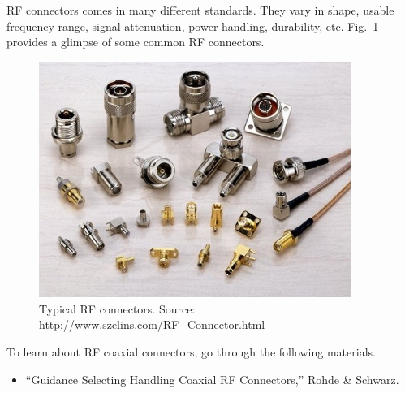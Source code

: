 \documentclass[letterpaper, 11pt]{article}
\begin{document}
RF connectors comes in many different standards. They vary in shape, usable frequency range, signal attenuation, power handling, durability, etc. Fig.~\ref{fig:connectors} provides a glimpse of some common RF connectors. 

\begin{figure}[h]
	\centering
	\includegraphics[width=4in]{connectors}
	\caption{Typical RF connectors. Source: \url{http://www.szelins.com/RF_Connector.html}}
	\label{fig:connectors}
\end{figure}

To learn about RF coaxial connectors, go through the following materials. 

\begin{itemize}[itemsep=0.1ex]
	\item ``Guidance Selecting Handling Coaxial RF Connectors,'' Rohde \& Schwarz.
\end{itemize}

\newpage
\reversemarginpar
{}  
\end{document}
